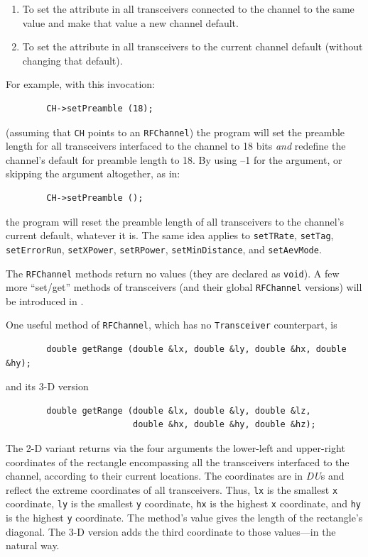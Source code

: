 \begin{enumerate}
\item
To set the attribute in all transceivers connected to the channel to the same
value and make that value a new channel default.
\item
To set the attribute in all transceivers to the current channel default
(without changing that default).
\end{enumerate}

\noindent
For example, with this invocation:
\begin{verbatim}
        CH->setPreamble (18);
\end{verbatim}
\noindent
(assuming that {\tt CH} points to an {\tt RFChannel}) the program will set the
preamble length for all transceivers interfaced to the channel to 18 bits
{\em and\/} redefine the channel's default for preamble length to 18.
By using --1 for the argument, or skipping the argument altogether, as in:
\begin{verbatim}
        CH->setPreamble ();
\end{verbatim}
the program will reset the preamble length of all transceivers to the channel's
current default, whatever it is.
The same idea applies to {\tt setTRate},
{\tt setTag},
{\tt setErrorRun},
{\tt setXPower},
{\tt setRPower},
{\tt setMinDistance}, and
{\tt setAevMode}.

The {\tt RFChannel} methods return no values (they are declared as {\tt void}).
A few more ``set/get'' methods of transceivers (and their global 
{\tt RFChannel} versions) will be introduced in .

One useful method of {\tt RFChannel}, which has no
{\tt Transceiver} counterpart, is
\begin{verbatim}
        double getRange (double &lx, double &ly, double &hx, double &hy);
\end{verbatim}
\noindent
and its 3-D version
\begin{verbatim}
        double getRange (double &lx, double &ly, double &lz,
                         double &hx, double &hy, double &hz);
\end{verbatim}
\noindent
The 2-D variant
returns via the four arguments the lower-left and upper-right
coordinates of the rectangle encompassing all the transceivers interfaced
to the channel, according to their current locations.
The coordinates are in {\em DU\/}s and reflect the extreme coordinates of
all transceivers.
Thus, {\tt lx} is the smallest {\tt x} coordinate, {\tt ly} is the smallest
{\tt y} coordinate, {\tt hx} is the highest {\tt x} coordinate, and
{\tt hy} is the highest {\tt y} coordinate.
The method's value gives the length of the rectangle's diagonal.
The 3-D version adds the third coordinate to those values---in the
natural way.

